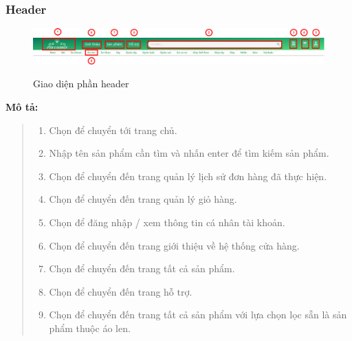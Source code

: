     \subsubsection{Header}
    \begin{figure}[!htp]
        \centering
        \includegraphics[width=5in]{img/UI/new_customer/header.png}
        \label{6}
        \newline
        \caption{Giao diện phần header}
    \end{figure}
    \textbf{Mô tả:}  
    \begin{quote}
        \begin{enumerate}
            \item Chọn để chuyển tới trang chủ.
            \item Nhập tên sản phẩm cần tìm và nhấn enter để tìm kiếm sản phẩm.
            \item Chọn để chuyển đến trang quản lý lịch sử đơn hàng đã thực hiện.
            \item Chọn để chuyển đến trang quản lý giỏ hàng.
            \item Chọn để đăng nhập / xem thông tin cá nhân tài khoản.
            \item Chọn để chuyển đến trang giới thiệu về hệ thống cửa hàng.
            \item Chọn để chuyển đến trang tất cả sản phẩm.
            \item Chọn để chuyển đến trang hỗ trợ.
            \item Chọn để chuyển đến trang tất cả sản phẩm với lựa chọn lọc sẵn là sản phẩm thuộc áo len.
        \end{enumerate}
    \end{quote}
   
